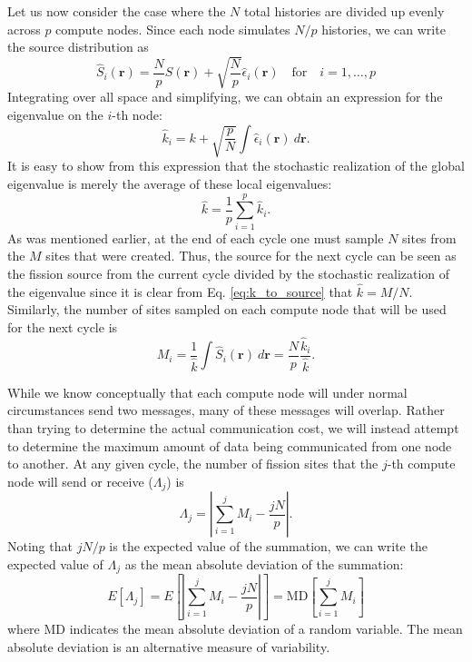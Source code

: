 \documentclass[11pt]{article}
\begin{document}
Let us now consider the case where the $N$ total histories are divided
up evenly across $p$ compute nodes. Since each node simulates $N/p$
histories, we can write the source distribution as
\begin{equation}
  \hat{S}_i(\mathbf{r})= \frac{N}{p} S(\mathbf{r}) +
  \sqrt{\frac{N}{p}} \hat{\epsilon}_i(\mathbf{r}) \quad \text{for}
  \quad i = 1, \dots, p
\end{equation}
Integrating over all space and simplifying, we can obtain an
expression for the eigenvalue on the $i$-th node:
\begin{equation}
  \hat{k}_i = k + \sqrt{\frac{p}{N}} \int \hat{\epsilon}_i(\mathbf{r})
  \: d\mathbf{r}.
\end{equation}
It is easy to show from this expression that the stochastic
realization of the global eigenvalue is merely the average of these
local eigenvalues:
\begin{equation}\label{eq:average_k_as_sum}
  \hat{k} = \frac{1}{p} \sum_{i=1}^p \hat{k}_i.
\end{equation}
As was mentioned earlier, at the end of each cycle one must sample $N$
sites from the $M$ sites that were created. Thus, the source for the
next cycle can be seen as the fission source from the current cycle
divided by the stochastic realization of the eigenvalue since it is
clear from Eq. \ref{eq:k_to_source} that $\hat{k} = M/N$. Similarly,
the number of sites sampled on each compute node that will be used for
the next cycle is
\begin{equation}\label{eq:sites_per_node}
  M_i = \frac{1}{\hat{k}} \int \hat{S}_i(\mathbf{r}) \: d\mathbf{r} =
  \frac{N}{p} \frac{\hat{k}_i}{\hat{k}}.
\end{equation}

While we know conceptually that each compute node will under normal
circumstances send two messages, many of these messages will
overlap. Rather than trying to determine the actual communication
cost, we will instead attempt to determine the maximum amount of data
being communicated from one node to another. At any given cycle, the
number of fission sites that the $j$-th compute node will send or
receive ($\Lambda_j$) is
\begin{equation}\label{eq:Lambda}
  \Lambda_j = \left | \sum_{i=1}^j M_i - \frac{jN}{p} \right |.
\end{equation}
Noting that $jN/p$ is the expected value of the summation, we can
write the expected value of $\Lambda_j$ as the mean absolute deviation
of the summation:
\begin{equation}
  E \left [ \Lambda_j \right ] = E \left [ \left | \sum_{i=1}^j M_i -
    \frac{jN}{p} \right | \right ] = \text{MD} \left [ \sum_{i=1}^j
    M_i \right ]
\end{equation}
where $\text{MD}$ indicates the mean absolute deviation of a random
variable. The mean absolute deviation is an alternative measure of
variability.
\end{document}
